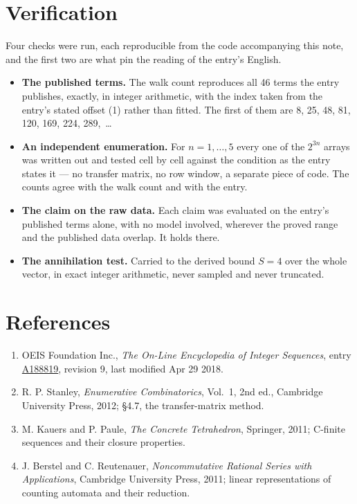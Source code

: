 \documentclass[11pt]{article}
\theoremstyle{definition}
\begin{document}
\section{Verification}

Four checks were run, each reproducible from the code accompanying this note, and the first two are what pin the reading of the entry's English.

\begin{itemize}

\item {\bfseries The published terms.} The walk count reproduces all 46 terms the entry publishes, exactly, in integer arithmetic, with the index taken from the entry's stated offset (1) rather than fitted. The first of them are 8, 25, 48, 81, 120, 169, 224, 289,~\dots

\item {\bfseries An independent enumeration.} For $n = 1,\dots,5$ every one of the $2^{3n}$ arrays was written out and tested cell by cell against the condition as the entry states it --- no transfer matrix, no row window, a separate piece of code. The counts agree with the walk count and with the entry.

\item {\bfseries The claim on the raw data.} Each claim was evaluated on the entry's published terms alone, with no model involved, wherever the proved range and the published data overlap. It holds there.

\item {\bfseries The annihilation test.} Carried to the derived bound $S = 4$ over the whole vector, in exact integer arithmetic, never sampled and never truncated.

\end{itemize}

\section{References}

\begin{enumerate}

\item OEIS Foundation Inc., \emph{The On-Line Encyclopedia of Integer Sequences}, entry \href{https://oeis.org/A188819}{A188819}, revision 9, last modified Apr 29 2018.

\item R. P. Stanley, \emph{Enumerative Combinatorics}, Vol.~1, 2nd ed., Cambridge University Press, 2012; \S4.7, the transfer-matrix method.

\item M. Kauers and P. Paule, \emph{The Concrete Tetrahedron}, Springer, 2011; C-finite sequences and their closure properties.

\item J. Berstel and C. Reutenauer, \emph{Noncommutative Rational Series with Applications}, Cambridge University Press, 2011; linear representations of counting automata and their reduction.

\end{enumerate}
\end{document}
